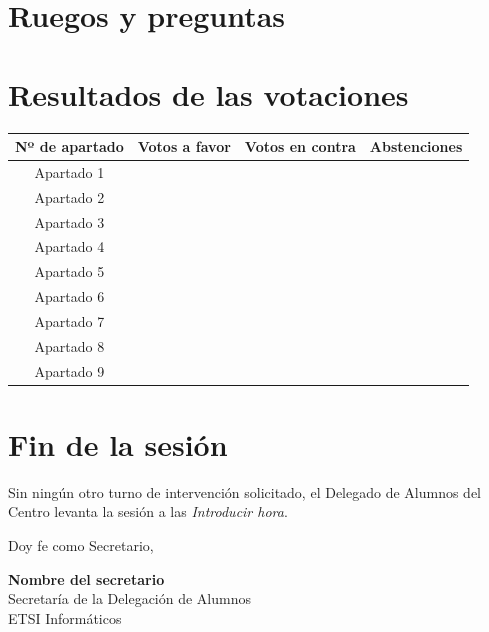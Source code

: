 \documentclass[12pt,spanish,a4paper]{article}
\begin{document}
    \section{}
      \lipsum[7]
    \newpage
    \section{}
      \lipsum[8]
    \newpage
    \section{Ruegos y preguntas}
      \lipsum[9]
    \newpage
    \section*{Resultados de las votaciones}
    \label{sec:results}
      \begin{center}
        \begin{tabular}{|c||c|c|c|}
          \hline
          Nº de apartado & Votos a favor & Votos en contra & Abstenciones \\
          \hline \hline
          Apartado 1 & & & \\
          \hline
          Apartado 2 & & & \\
          \hline
          Apartado 3 & & & \\
          \hline
          Apartado 4 & & & \\
          \hline
          Apartado 5 & & & \\
          \hline
          Apartado 6 & & & \\
          \hline
          Apartado 7 & & & \\
          \hline
          Apartado 8 & & & \\
          \hline
          Apartado 9 & & & \\
          \hline
        \end{tabular}
      \end{center}
    \section*{Fin de la sesión}
    \label{sec:fin}
      Sin ningún otro turno de intervención solicitado, el Delegado de Alumnos del Centro levanta
      la sesión a las \textit{Introducir hora}.\par
      Doy fe como Secretario,

      \quad

      \quad

      \quad

      \begin{center}
        \textbf{Nombre del secretario}\\
        Secretaría de la Delegación de Alumnos\\
        ETSI Informáticos 
      \end{center}
\end{document}
